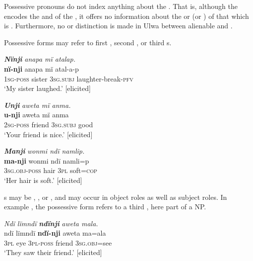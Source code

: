  Possessive pronouns do not index anything about the . That is, although the  encodes the  and  of the , it offers no information about the  or  (or ) of that which is . Furthermore, no  or  distinction is made in Ulwa between  alienable and .

  Possessive forms may refer to first  , second  , or third   s.

\ea%
    \label{ex:pron:3}
            \textbf{\textit{Nïnji}} \textit{anapa mï atalap.}\\
\gll    \textbf{nï-nji}    anapa  mï      atal-a-p\\
    1\textsc{sg-poss}  sister  3\textsc{sg.subj}  laughter-break-\textsc{pfv}\\
\glt `My sister laughed.’ [elicited]
\z

\ea%
    \label{ex:pron:4}
            \textbf{\textit{Unji}} \textit{aweta mï anma.}\\
\gll    \textbf{u-nji}    aweta  mï      anma\\
    2\textsc{sg-poss}  friend  3\textsc{sg.subj}  good\\
\glt `Your friend is nice.’ [elicited]
\z

\ea%
    \label{ex:pron:5}
            \textbf{\textit{Manji}} \textit{wonmi ndï namlip.}\\
\gll    \textbf{ma-nji}      wonmi    ndï  namli=p\\
    \textsc{3sg.obj-poss}  hair    \textsc{3pl}  soft=\textsc{cop}\\
\glt `Her hair is soft.’ [elicited]
\z

s may be , , or , and may occur in object roles as well as subject roles. In example , the possessive form refers to a third   , here part of a  NP.

\ea%
    \label{ex:pron:6}
            \textit{Ndï lïmndï} \textbf{\textit{ndïnji}} \textit{aweta mala.}\\
\gll    ndï  lïmndï  \textbf{ndï-nji}    aweta  ma=ala\\
    \textsc{3pl}  eye    \textsc{3pl-poss}  friend  \textsc{3sg.obj=}see\\
\glt `They saw their friend.’ [elicited]
\z

